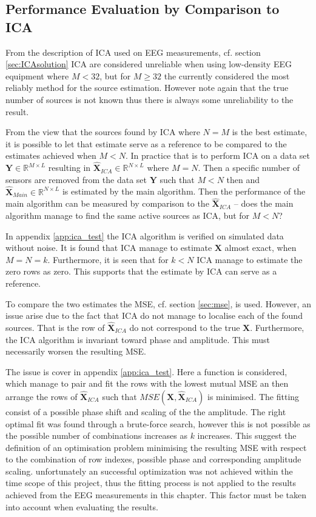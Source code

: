 \subsection{Performance Evaluation by Comparison to ICA}
From the description of ICA used on EEG measurements, cf. section \ref{sec:ICAsolution} ICA are considered unreliable when using low-density EEG equipment where $M<32$, but for $M \geq 32$ the currently considered the most reliably method for the source estimation. However note again that the true number of sources is not known thus there is always some unreliability to the result. 

From the view that the sources found by ICA where $N=M$ is the best estimate, it is possible to let that estimate serve as a reference to be compared to the estimates achieved when $M<N$. 
In practice that is to perform ICA on a data set $\textbf{Y} \in \mathbb{R}^{M \times L}$ resulting in $\hat{\textbf{X}}_{ICA}\in \mathbb{R}^{N\times L}$ where $M=N$. 
Then a specific number of sensors are removed from the data set $\textbf{Y}$ such that $M<N$ then and $\hat{\textbf{X}}_{Main}\in \mathbb{R}^{N\times L}$ is estimated by the main algorithm. 
Then the performance of the main algorithm can be measured by comparison to the $\hat{\textbf{X}}_{ICA}$ -- does the main algorithm manage to find the same active sources as ICA, but for $M<N$?

In appendix \ref{app:ica_test} the ICA algorithm is verified on simulated data without noise. 
It is found that ICA manage to estimate $\textbf{X}$ almost exact, when $M=N=k$. 
Furthermore, it is seen that for $k < N$ ICA manage to estimate the zero rows as zero. This supports that the estimate by ICA can serve as a reference.     

To compare the two estimates the MSE, cf. section \ref{sec:mse}, is used. 
However, an issue arise due to the fact that ICA do not manage to localise each of the found sources. 
That is the row of $\hat{\textbf{X}}_{ICA}$ do not correspond to the true $\textbf{X}$. 
Furthermore, the ICA algorithm is invariant toward phase and amplitude. This must necessarily worsen the resulting MSE.  

The issue is cover in appendix \ref{app:ica_test}. 
Here a function is considered, which manage to pair and fit the rows with the lowest mutual MSE an then arrange the rows of $\hat{\textbf{X}}_{ICA}$ such that $MSE(\textbf{X},\hat{\textbf{X}}_{ICA})$ is minimised. 
The fitting consist of a possible phase shift and scaling of the the amplitude. 
The right optimal fit was found through a brute-force search, however this is not possible as the possible number of combinations increases as $k$ increases. 
This suggest the definition of an optimisation problem minimising the resulting MSE with respect to the combination of row indexes, possible phase and corresponding amplitude scaling. 
unfortunately an successful optimization was not achieved within the time scope of this project, thus the fitting process is not applied to the results achieved from the EEG measurements in this chapter. 
This factor must be taken into account when evaluating the results.    

